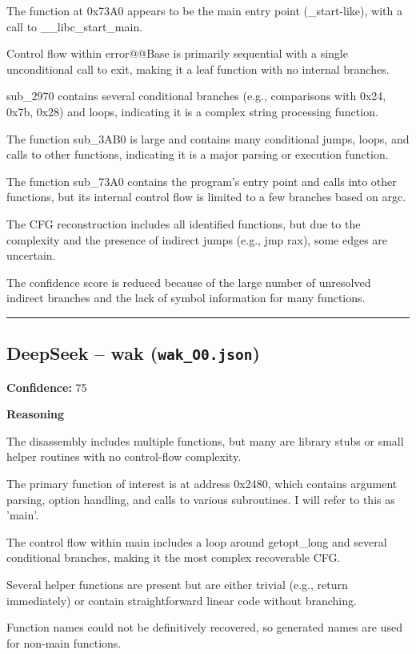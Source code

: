 The function at 0x73A0 appears to be the main entry point (\_start-like), with a call to \_\_libc\_start\_main.

Control flow within error@@Base is primarily sequential with a single unconditional call to exit, making it a leaf function with no internal branches.

sub\_2970 contains several conditional branches (e.g., comparisons with 0x24, 0x7b, 0x28) and loops, indicating it is a complex string processing function.

The function sub\_3AB0 is large and contains many conditional jumps, loops, and calls to other functions, indicating it is a major parsing or execution function.

The function sub\_73A0 contains the program's entry point and calls into other functions, but its internal control flow is limited to a few branches based on argc.

The CFG reconstruction includes all identified functions, but due to the complexity and the presence of indirect jumps (e.g., jmp rax), some edges are uncertain.

The confidence score is reduced because of the large number of unresolved indirect branches and the lack of symbol information for many functions.

\bigskip
\hrule
\bigskip

\subsection{DeepSeek -- wak (\texttt{wak\_O0.json})}

\textbf{Confidence:} 75

\textbf{Reasoning}

The disassembly includes multiple functions, but many are library stubs or small helper routines with no control-flow complexity.

The primary function of interest is at address 0x2480, which contains argument parsing, option handling, and calls to various subroutines. I will refer to this as 'main'.

The control flow within main includes a loop around getopt\_long and several conditional branches, making it the most complex recoverable CFG.

Several helper functions are present but are either trivial (e.g., return immediately) or contain straightforward linear code without branching.

Function names could not be definitively recovered, so generated names are used for non-main functions.

